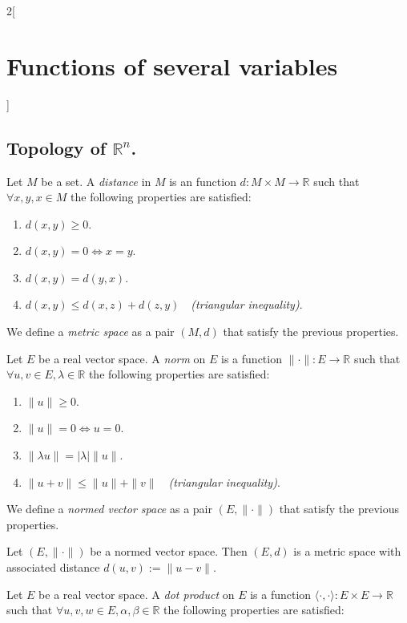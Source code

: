 \documentclass[class=article,10pt,crop=false]{standalone}
\begin{document}
\begin{multicols}{2}[\section{Functions of several variables}]
\subsection{Topology of \texorpdfstring{$\mathbb{R}^n$}{Rn}.}
\begin{definition}
Let $M$ be a set. A \textit{distance} in $M$ is an function $d:M\times M\rightarrow\mathbb{R}$ such that $\forall x,y,x\in M$ the following properties are satisfied:
\begin{enumerate}
    \item $d(x,y)\geq 0$.
    \item $d(x,y)=0\iff x=y$.
    \item $d(x,y)=d(y,x)$.
    \item $d(x,y)\leq d(x,z)+d(z,y)\quad$\textit{(triangular inequality)}.
\end{enumerate}
We define a \textit{metric space} as a pair $(M,d)$ that satisfy the previous properties.
\end{definition}
\begin{definition}
Let $E$ be a real vector space. A \textit{norm} on $E$ is a function $\|\cdot\|:E\rightarrow\mathbb{R}$ such that $\forall u,v\in E,\lambda\in\mathbb{R}$ the following properties are satisfied:
\begin{enumerate}
    \item $\|u\|\geq 0$.
    \item $\|u\|=0\iff u=0$.
    \item $\|\lambda u\|=|\lambda|\|u\|$.
    \item $\|u+v\|\leq \|u\|+\|v\|\quad$\textit{(triangular inequality)}.
\end{enumerate}
We define a \textit{normed vector space} as a pair $(E,\|\cdot\|)$ that satisfy the previous properties.
\end{definition}
\begin{prop}
Let $(E,\|\cdot\|)$ be a normed vector space. Then $(E,d)$ is a metric space with associated distance $d(u,v):=\|u-v\|$.
\end{prop}
\begin{definition}
Let $E$ be a real vector space. A \textit{dot product} on $E$ is a function $\langle\cdot,\cdot\rangle:E\times E\rightarrow\mathbb{R}$ such that $\forall u,v,w\in E,\alpha,\beta\in\mathbb{R}$ the following properties are satisfied:

\end{definition}
\end{multicols}
\end{document}
